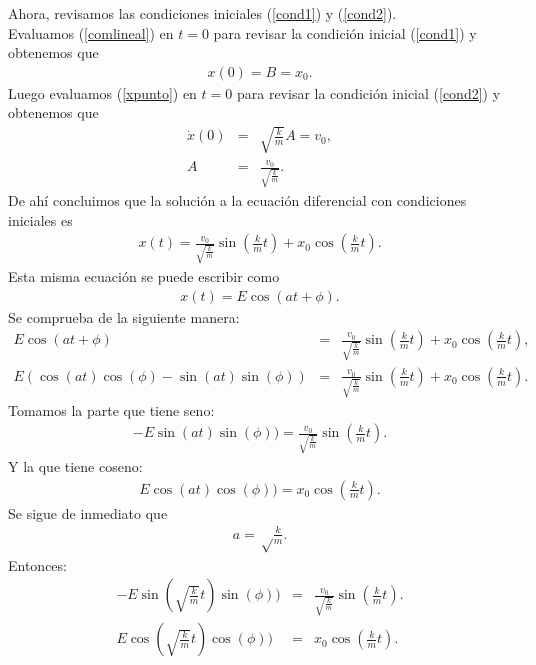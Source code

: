 \documentclass[letterpaper,12pt,oneside]{book}
\begin{document}
%
Ahora, revisamos las condiciones iniciales (\ref{cond1}) y (\ref{cond2}).\\
Evaluamos (\ref{comlineal}) en $t=0$ para revisar la condici\'on inicial (\ref{cond1}) y obtenemos que
%
\begin{eqnarray}
x(0) = B = x_0. \nonumber
\end{eqnarray}
%
Luego evaluamos (\ref{xpunto}) en $t=0$ para revisar la condici\'on inicial (\ref{cond2}) y obtenemos que
%
\begin{eqnarray}
\dot x(0) &=& \sqrt{\frac{k}{m}}A = v_0,\nonumber \\
A&=&\frac{v_0}{\sqrt{\frac{k}{m}}}.\nonumber
\end{eqnarray}
%
De ah\'i concluimos que la soluci\'on a la ecuaci\'on diferencial con condiciones iniciales es
%
\begin{eqnarray}
x(t) = \frac{v_0}{\sqrt{\frac{k}{m}}}\sin\left(\frac{k}{m}t\right) + x_0 \cos\left(\frac{k}{m}t\right).\nonumber
\end{eqnarray}
%
Esta misma ecuaci\'on se puede escribir como
%
\begin{eqnarray}
x(t) = E \cos(at + \phi). \nonumber
\end{eqnarray}
%
Se comprueba de la siguiente manera:
%
\begin{eqnarray}
E \cos(at + \phi) &=& \frac{v_0}{\sqrt{\frac{k}{m}}}\sin\left(\frac{k}{m}t\right) + x_0 \cos\left(\frac{k}{m}t\right),\nonumber\\ 
E (\cos(at) \cos(\phi) -\sin(at)\sin(\phi))  &=& \frac{v_0}{\sqrt{\frac{k}{m}}}\sin\left(\frac{k}{m}t\right) + x_0 \cos\left(\frac{k}{m}t\right).\nonumber
\end{eqnarray}
%
Tomamos la parte que tiene seno:
%
\begin{eqnarray}
-E \sin(at)\sin(\phi)) = \frac{v_0}{\sqrt{\frac{k}{m}}}\sin\left(\frac{k}{m}t\right).\nonumber
\end{eqnarray}
%
Y la que tiene coseno:
%
\begin{eqnarray}
E \cos(at)\cos(\phi)) =x_0\cos\left(\frac{k}{m}t\right).\nonumber
\end{eqnarray}
%
Se sigue de inmediato que
\begin{eqnarray}
a=\sqrt\frac{k}{m}.\nonumber
\end{eqnarray}
%
Entonces:
\begin{eqnarray}
-E \sin(\sqrt{\frac{k}{m}}t)\sin(\phi)) &=& \frac{v_0}{\sqrt{\frac{k}{m}}}\sin\left(\frac{k}{m}t\right).\nonumber\\
E \cos(\sqrt{\frac{k}{m}}t)\cos(\phi)) &=&x_0\cos\left(\frac{k}{m}t\right).\nonumber
\end{eqnarray}
\end{document}
